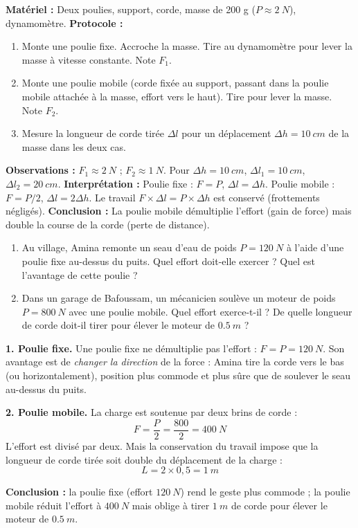 \documentclass[11pt]{article}
\begin{document}
\begin{experience}
\textbf{Matériel :} Deux poulies, support, corde, masse de 200 g ($P \approx \SI{2}{N}$), dynamomètre.
\textbf{Protocole :}
\begin{enumerate}
\item Monte une poulie fixe. Accroche la masse. Tire au dynamomètre pour lever la masse à vitesse constante. Note $F_1$.
\item Monte une poulie mobile (corde fixée au support, passant dans la poulie mobile attachée à la masse, effort vers le haut). Tire pour lever la masse. Note $F_2$.
\item Mesure la longueur de corde tirée $\Delta l$ pour un déplacement $\Delta h = \SI{10}{cm}$ de la masse dans les deux cas.
\end{enumerate}
\textbf{Observations :} $F_1 \approx \SI{2}{N}$ ; $F_2 \approx \SI{1}{N}$. Pour $\Delta h = \SI{10}{cm}$, $\Delta l_1 = \SI{10}{cm}$, $\Delta l_2 = \SI{20}{cm}$.
\textbf{Interprétation :} Poulie fixe : $F=P$, $\Delta l = \Delta h$. Poulie mobile : $F=P/2$, $\Delta l = 2 \Delta h$. Le travail $F \times \Delta l = P \times \Delta h$ est conservé (frottements négligés).
\textbf{Conclusion :} La poulie mobile démultiplie l'effort (gain de force) mais double la course de la corde (perte de distance).
\end{experience}

\begin{exoresolu}
\begin{enumerate}
\item Au village, Amina remonte un seau d'eau de poids $P = \SI{120}{N}$ à l'aide d'une poulie fixe au-dessus du puits. Quel effort doit-elle exercer ? Quel est l'avantage de cette poulie ?
\item Dans un garage de Bafoussam, un mécanicien soulève un moteur de poids $P = \SI{800}{N}$ avec une poulie mobile. Quel effort exerce-t-il ? De quelle longueur de corde doit-il tirer pour élever le moteur de $\SI{0,5}{m}$ ?
\end{enumerate}
\tcblower
\textbf{1. Poulie fixe.} Une poulie fixe ne démultiplie pas l'effort : $F = P = \SI{120}{N}$. Son avantage est de \emph{changer la direction} de la force : Amina tire la corde vers le bas (ou horizontalement), position plus commode et plus sûre que de soulever le seau au-dessus du puits.

\textbf{2. Poulie mobile.} La charge est soutenue par deux brins de corde :
\[ F = \frac{P}{2} = \frac{800}{2} = \SI{400}{N} \]
L'effort est divisé par deux. Mais la conservation du travail impose que la longueur de corde tirée soit double du déplacement de la charge :
\[ L = 2 \times 0{,}5 = \SI{1}{m} \]

\textbf{Conclusion :} la poulie fixe (effort $\SI{120}{N}$) rend le geste plus commode ; la poulie mobile réduit l'effort à $\SI{400}{N}$ mais oblige à tirer $\SI{1}{m}$ de corde pour élever le moteur de $\SI{0,5}{m}$.
\end{exoresolu}
\end{document}
